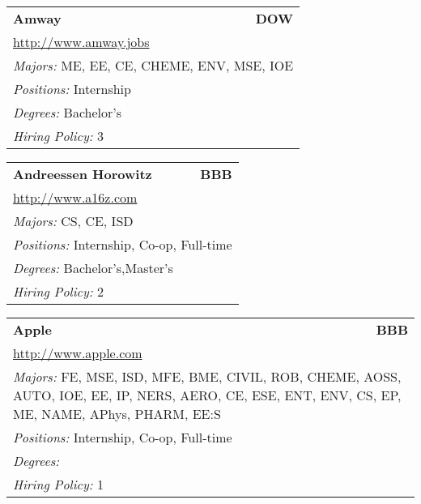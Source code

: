 \documentclass[twoside]{article}
\begin{document}
\begin{center}
\begin{multicols}{3}
\begin{FlushLeft}
\begin{minipage}{.9\columnwidth}
\end{minipage}
 
\begin{minipage}{.9\columnwidth}\begin{tabularx}{.95\columnwidth}{Xr}
                 {\Large\bf Amway} & {\Large\bf DOW}\\
    \multicolumn{2}{p{.95\columnwidth}}{\url{http://www.amway.jobs}}\\
    \multicolumn{2}{p{.95\columnwidth}}{\emph{Majors:} ME, EE, CE, CHEME, ENV, MSE, IOE}\\
    \multicolumn{2}{p{.95\columnwidth}}{\emph{Positions:} Internship}\\
    \multicolumn{2}{p{.95\columnwidth}}{\emph{Degrees:} Bachelor's}\\
    \multicolumn{2}{p{.95\columnwidth}}{\emph{Hiring Policy:} 3}\\
    \end{tabularx}
    
\end{minipage}
 
\begin{minipage}{.9\columnwidth}\begin{tabularx}{.95\columnwidth}{Xr}
                 {\Large\bf Andreessen Horowitz} & {\Large\bf BBB}\\
    \multicolumn{2}{p{.95\columnwidth}}{\url{http://www.a16z.com}}\\
    \multicolumn{2}{p{.95\columnwidth}}{\emph{Majors:} CS, CE, ISD}\\
    \multicolumn{2}{p{.95\columnwidth}}{\emph{Positions:} Internship, Co-op, Full-time}\\
    \multicolumn{2}{p{.95\columnwidth}}{\emph{Degrees:} Bachelor's,Master's}\\
    \multicolumn{2}{p{.95\columnwidth}}{\emph{Hiring Policy:} 2}\\
    \end{tabularx}
    
\end{minipage}
 
\begin{minipage}{.9\columnwidth}\begin{tabularx}{.95\columnwidth}{Xr}
                 {\Large\bf Apple} & {\Large\bf BBB}\\
    \multicolumn{2}{p{.95\columnwidth}}{\url{http://www.apple.com}}\\
    \multicolumn{2}{p{.95\columnwidth}}{\emph{Majors:} FE, MSE, ISD, MFE, BME, CIVIL, ROB, CHEME, AOSS, AUTO, IOE, EE, IP, NERS, AERO, CE, ESE, ENT, ENV, CS, EP, ME, NAME, APhys, PHARM, EE:S}\\
    \multicolumn{2}{p{.95\columnwidth}}{\emph{Positions:} Internship, Co-op, Full-time}\\
    \multicolumn{2}{p{.95\columnwidth}}{\emph{Degrees:} }\\
    \multicolumn{2}{p{.95\columnwidth}}{\emph{Hiring Policy:} 1}\\
    \end{tabularx}
    

\end{minipage}
\end{FlushLeft}
\end{multicols}
\end{center}
\end{document}

